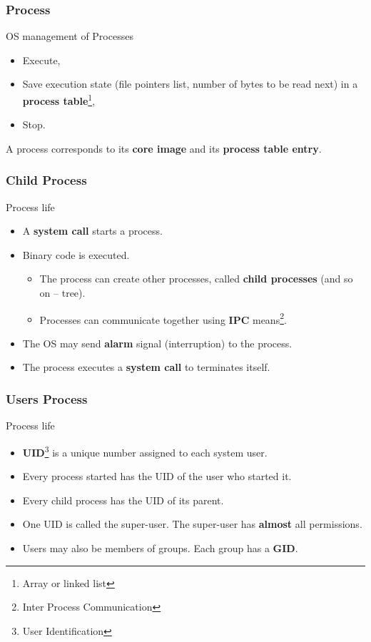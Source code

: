   \begin{frame}
    \frametitle{Process}
      \begin{block}{OS management of Processes}
        \begin{itemize}
          \item Execute,
          \item Save execution state (file pointers list, number of bytes to be read next) in a \textbf{process table}\footnote{Array or linked list},
          \item Stop.
        \end{itemize}
      \end{block}
    A process corresponds to its \textbf{core image} and its \textbf{process table entry}.
  \end{frame}
  \begin{frame}
    \frametitle{Child Process}
      \begin{block}{Process life}
        \begin{itemize}
          \item A \textbf{system call} starts a process.
          \item Binary code is executed.
            \begin{itemize}
              \item The process can create other processes, called \textbf{child processes} (and so on -- tree).
              \item Processes can communicate together using \textbf{IPC} means\footnote{Inter Process Communication}.
            \end{itemize}
          \item The OS may send \textbf{alarm} signal (interruption) to the process.
          \item The process executes a \textbf{system call} to terminates itself.
        \end{itemize}
      \end{block}
  \end{frame}
  \begin{frame}
    \frametitle{Users Process}
      \begin{block}{Process life}
        \begin{itemize}
          \item \textbf{UID}\footnote{User Identification} is a unique number assigned to each system user.
          \item Every process started has the UID of the user who started it.
          \item Every child process has the UID of its parent.
          \item One UID is called the super-user. The super-user has \textbf{almost} all permissions.
          \item Users may also be members of groups. Each group has a \textbf{GID}.
        \end{itemize}
      \end{block}
  \end{frame}

